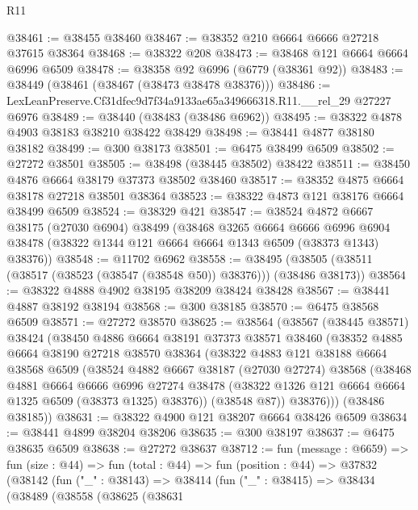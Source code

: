 \begin{lexlean}{R11}
\begin{coremodule}
@38461 := @38455 @38460
@38467 := @38352 @210 @6664 @6666 @27218 @37615 @38364
@38468 := @38322 @208
@38473 := @38468 @121 @6664 @6664 @6996 @6509
@38478 := @38358 @92 @6996 (@6779 (@38361 @92))
@38483 := @38449 (@38461 (@38467 (@38473 @38478 @38376)))
@38486 := LexLeanPreserve.Cf31dfec9d7f34a9133ae65a349666318.R11.__rel_29 @27227 @6976
@38489 := @38440 (@38483 (@38486 @6962))
@38495 := @38322 @4878 @4903 @38183 @38210 @38422 @38429
@38498 := @38441 @4877 @38180 @38182
@38499 := @300 @38173
@38501 := @6475 @38499 @6509
@38502 := @27272 @38501
@38505 := @38498 (@38445 @38502) @38422
@38511 := @38450 @4876 @6664 @38179 @37373 @38502 @38460
@38517 := @38352 @4875 @6664 @38178 @27218 @38501 @38364
@38523 := @38322 @4873 @121 @38176 @6664 @38499 @6509
@38524 := @38329 @421
@38547 := @38524
    @4872
    @6667
    @38175
    (@27030 @6904)
    @38499
    (@38468
      @3265
      @6664
      @6666
      @6996
      @6904
      @38478
      (@38322 @1344 @121 @6664 @6664 @1343 @6509 (@38373 @1343) @38376))
@38548 := @11702 @6962
@38558 := @38495 (@38505 (@38511 (@38517 (@38523 (@38547 (@38548 @50)) @38376))) (@38486 @38173))
@38564 := @38322 @4888 @4902 @38195 @38209 @38424 @38428
@38567 := @38441 @4887 @38192 @38194
@38568 := @300 @38185
@38570 := @6475 @38568 @6509
@38571 := @27272 @38570
@38625 := @38564
    (@38567
      (@38445 @38571)
      @38424
      (@38450
        @4886
        @6664
        @38191
        @37373
        @38571
        @38460
        (@38352
          @4885
          @6664
          @38190
          @27218
          @38570
          @38364
          (@38322
            @4883
            @121
            @38188
            @6664
            @38568
            @6509
            (@38524
              @4882
              @6667
              @38187
              (@27030 @27274)
              @38568
              (@38468
                @4881
                @6664
                @6666
                @6996
                @27274
                @38478
                (@38322 @1326 @121 @6664 @6664 @1325 @6509 (@38373 @1325) @38376))
              (@38548 @87))
            @38376)))
      (@38486 @38185))
@38631 := @38322 @4900 @121 @38207 @6664 @38426 @6509
@38634 := @38441 @4899 @38204 @38206
@38635 := @300 @38197
@38637 := @6475 @38635 @6509
@38638 := @27272 @38637
@38712 := fun (message : @6659) =>
  fun (size : @44) =>
  fun (total : @44) =>
  fun (position : @44) =>
  @37832
    (@38142
      (fun ("_" : @38143) =>
      @38414
        (fun ("_" : @38415) =>
        @38434
          (@38489
            (@38558
              (@38625
                (@38631

\end{coremodule}
\end{lexlean}
